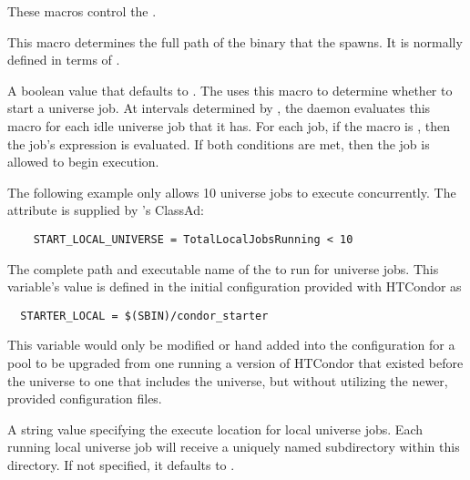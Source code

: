 These macros control the .
\begin{description}

\label{param:Shadow}
\item[\Macro{SHADOW}]
  This macro determines the
  full path of the  binary that the 
  spawns.  It is normally defined in terms of . 
  
\label{param:StartLocalUniverse}
\item[\Macro{START\_LOCAL\_UNIVERSE}]
  A boolean value that defaults to .
  The  uses this macro to determine whether to start
  a  universe job. 
  At intervals determined by , 
  the  daemon evaluates this macro
  for each idle  universe job that it has.
  For each job, if the  
  macro is , then the job's  expression
  is evaluated. If both conditions are met, then the job is allowed
  to begin execution. 
  
  The following example only allows 10  universe jobs to
  execute concurrently. The attribute 
  is supplied by 's ClassAd:
  
  \footnotesize
  \begin{verbatim}
    START_LOCAL_UNIVERSE = TotalLocalJobsRunning < 10
  \end{verbatim}
  \normalsize
  
\label{param:StarterLocal}
\item[\Macro{STARTER\_LOCAL}]
  The complete path and executable name of the  to
  run for  universe jobs.  This variable's value
  is defined in the initial configuration provided with HTCondor as
  \footnotesize
  \begin{verbatim}
  STARTER_LOCAL = $(SBIN)/condor_starter
  \end{verbatim}
  \normalsize
  This variable would only be modified or hand added into 
  the configuration for a pool to be upgraded from one
  running a version of HTCondor that existed before the
   universe to one that includes the
   universe, but without utilizing the newer, provided
  configuration files.

\label{param:LocalUnivExecute}
\item[\Macro{LOCAL\_UNIV\_EXECUTE}]
  A string value specifying the execute location for local
  universe jobs.  Each running local universe job will receive a
  uniquely named subdirectory within this directory.
  If not specified, it defaults to .


\end{description}
